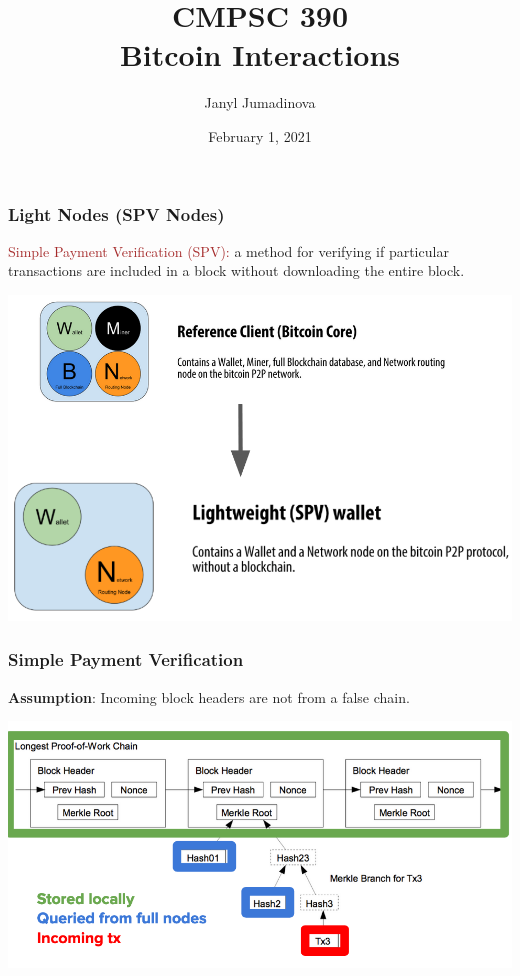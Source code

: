\documentclass{beamer}
\title{CMPSC 390 \\ Bitcoin Interactions}
\author{Janyl Jumadinova}
\date{February 1, 2021}
\begin{document}
\begin{frame}
  \titlepage
\end{frame}

\begin{frame}
  \frametitle{Light Nodes (SPV Nodes) }
 	\begin{block}{\textcolor{brown}{Simple Payment Verification (SPV): }}
 	 a method for verifying if particular transactions are included in a block without downloading the entire block.
 	\end{block}
 	\pause
 	\centering
	\includegraphics[scale=0.35]{nodes}
\end{frame}
\begin{frame}
  \frametitle{Simple Payment Verification}
 	\begin{block}{\textbf{Assumption}: }
Incoming block headers are not from a false chain.
 	\end{block}
 	\centering
	\includegraphics[scale=0.5]{transact}
\end{frame}
\end{document}
